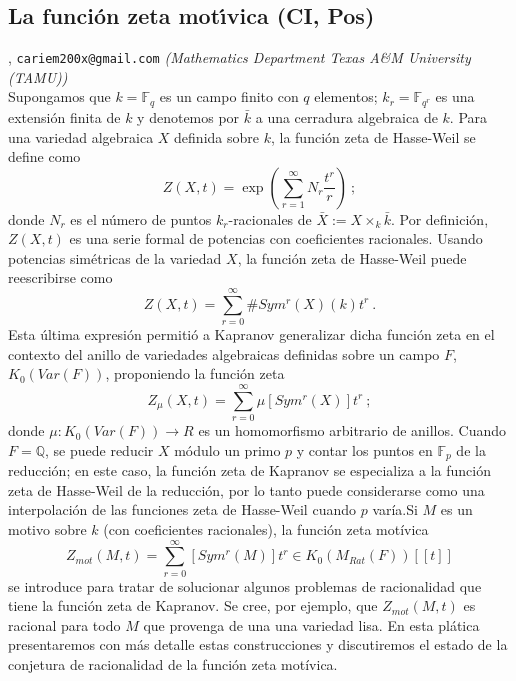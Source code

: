 \subsection{\sffamily La funci\'on zeta mot\'\i vica {\footnotesize (CI, Pos)}} \label{reg-1294} 
, {\tt cariem200x@gmail.com}  {\slshape (Mathematics Department Texas A\&M University (TAMU))}\\
        \noindent Supongamos que $k=\mathbb{F}_{q}$ es un campo finito con $q$ elementos; $k_{r}=\mathbb{F}_{q^{r}}$ es una extensi\'on finita de $k$ y denotemos por $\bar{k}$ a una cerradura algebraica de $k$. Para una variedad algebraica $X$ definida sobre $k$, la funci\'on zeta de Hasse-Weil se define como\[ Z(X,t)= \exp \left( \sum_{r=1}^{\infty} N_{r} \frac{t^{r}}{r}  \right) \ ;  \]donde $N_{r}$ es el n\'umero de puntos $k_{r}$-racionales de $\bar{X}:= X \times_{k} \bar{k}$. Por definici\'on, $Z(X,t)$ es una serie formal de potencias con coeficientes racionales. Usando potencias sim\'etricas de la variedad $X$, la funci\'on zeta de Hasse-Weil puede reescribirse como\[ Z(X,t)= \sum_{r=0}^{\infty} \# Sym^{r}(X)(k) t^{r} \ . \]Esta \'ultima expresi\'on permiti\'o a Kapranov generalizar dicha funci\'on zeta en el contexto del anillo de variedades algebraicas definidas sobre un campo $F$, $K_{0}(Var(F))$, proponiendo la funci\'on zeta\[ Z_{\mu}(X,t)= \sum_{r=0}^{\infty} \mu[Sym^{r}(X)] t^{r} \ ; \]donde $\mu:K_{0}(Var(F)) \to R$ es un homomorfismo arbitrario de anillos. Cuando $F= \mathbb{Q}$, se puede reducir $X$ m\'odulo un primo $p$ y contar los puntos en $\mathbb{F}_{p}$ de la reducci\'on; en este caso, la funci\'on zeta de Kapranov se especializa a la funci\'on zeta de Hasse-Weil de la reducci\'on, por lo tanto puede considerarse como una interpolaci\'on de las funciones zeta de Hasse-Weil cuando $p$ var\'ia.Si $M$ es un motivo sobre $k$ (con coeficientes racionales), la funci\'on zeta mot\'ivica\[ Z_{mot}(M,t)= \sum_{r=0}^{\infty} [Sym^{r}(M)] t^{r} \in K_{0}(M_{Rat}(F))[[t]] \]se introduce para tratar de solucionar algunos problemas de racionalidad que tiene la funci\'on zeta de Kapranov. Se cree, por ejemplo, que $Z_{mot}(M,t)$ es racional para todo $M$ que provenga de una una variedad lisa. En esta pl\'atica presentaremos con m\'as detalle estas construcciones y discutiremos el estado de la conjetura de racionalidad de la funci\'on zeta mot\'ivica.
